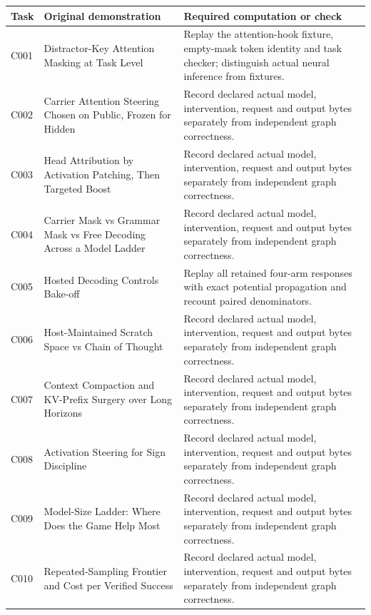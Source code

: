 \documentclass[
  11pt,
]{article}
\begin{document}
\begin{longtable}[]{@{}
  >{\raggedright\arraybackslash}p{}
  >{\raggedright\arraybackslash}p{}
  >{\raggedright\arraybackslash}p{}@{}}
\toprule\noalign{}
\begin{minipage}[b]{\linewidth}\raggedright
Task
\end{minipage} & \begin{minipage}[b]{\linewidth}\raggedright
Original demonstration
\end{minipage} & \begin{minipage}[b]{\linewidth}\raggedright
Required computation or check
\end{minipage} \\
\midrule\noalign{}
\endhead
\bottomrule\noalign{}
\endlastfoot
C001 & Distractor-Key Attention Masking at Task Level & Replay the
attention-hook fixture, empty-mask token identity and task checker;
distinguish actual neural inference from fixtures. \\
C002 & Carrier Attention Steering Chosen on Public, Frozen for Hidden &
Record declared actual model, intervention, request and output bytes
separately from independent graph correctness. \\
C003 & Head Attribution by Activation Patching, Then Targeted Boost &
Record declared actual model, intervention, request and output bytes
separately from independent graph correctness. \\
C004 & Carrier Mask vs Grammar Mask vs Free Decoding Across a Model
Ladder & Record declared actual model, intervention, request and output
bytes separately from independent graph correctness. \\
C005 & Hosted Decoding Controls Bake-off & Replay all retained four-arm
responses with exact potential propagation and recount paired
denominators. \\
C006 & Host-Maintained Scratch Space vs Chain of Thought & Record
declared actual model, intervention, request and output bytes separately
from independent graph correctness. \\
C007 & Context Compaction and KV-Prefix Surgery over Long Horizons &
Record declared actual model, intervention, request and output bytes
separately from independent graph correctness. \\
C008 & Activation Steering for Sign Discipline & Record declared actual
model, intervention, request and output bytes separately from
independent graph correctness. \\
C009 & Model-Size Ladder: Where Does the Game Help Most & Record
declared actual model, intervention, request and output bytes separately
from independent graph correctness. \\
C010 & Repeated-Sampling Frontier and Cost per Verified Success & Record
declared actual model, intervention, request and output bytes separately
from independent graph correctness. \\
\end{longtable}
\end{document}
